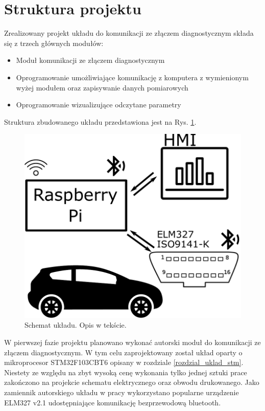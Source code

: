 \documentclass[12pt]{article} %
\numberwithin{equation}{subsection}
\numberwithin{figure}{section}
\numberwithin{table}{section}
\begin{document}
	\newpage
	
	\section{Struktura projektu}
	\hspace{0.5cm}Zrealizowany projekt układu do komunikacji ze złączem diagnostycznym składa się z trzech głównych modułów:
	
	\begin{itemize}
		\item{Moduł komunikacji ze złączem diagnostycznym}
		\item{Oprogramowanie umożliwiające komunikację z komputera z wymienionym wyżej modułem oraz zapisywanie danych pomiarowych}
		\item{Oprogramowanie wizualizujące odczytane parametry}
	\end{itemize}
	
	Struktura zbudowanego układu przedstawiona jest na Rys. \ref{rys_schemat_ukladu}.
	
		\begin{figure}[ht]
		\centering
		\includegraphics[scale=0.8]{Images/SchematUkladu.pdf}
		\caption{Schemat układu. Opis w tekście.}
		\label{rys_schemat_ukladu}
		\end{figure}
	
	W pierwszej fazie projektu planowano wykonać autorski moduł do komunikacji ze złączem diagnostycznym. W tym celu zaprojektowany został układ oparty o mikroprocesor STM32F103CBT6 opisany w rozdziale \ref{rozdzial_uklad_stm}. Niestety ze względu na zbyt wysoką cenę wykonania tylko jednej sztuki prace zakończono na projekcie schematu elektrycznego oraz obwodu drukowanego. Jako zamiennik autorskiego układu w pracy wykorzystano popularne urządzenie ELM327 v2.1 udostępniające komunikację bezprzewodową bluetooth. 
	
\end{document}
